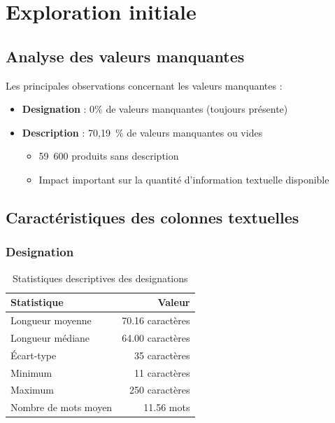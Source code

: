 \documentclass[12pt,a4paper]{article}
\begin{document}
\section{Exploration initiale}

\subsection{Analyse des valeurs manquantes}

Les principales observations concernant les valeurs manquantes :

\begin{itemize}
    \item \textbf{Designation} : 0\% de valeurs manquantes (toujours présente)
    \item \textbf{Description} : 70,19~\% de valeurs manquantes ou vides
    \begin{itemize}
        \item 59~600 produits sans description
        \item Impact important sur la quantité d'information textuelle disponible
    \end{itemize}
\end{itemize}

\subsection{Caractéristiques des colonnes textuelles}

\subsubsection{Designation}

\begin{table}[H]
\centering
\begin{tabular}{@{}lr@{}}
\toprule
\textbf{Statistique} & \textbf{Valeur} \\
\midrule
Longueur moyenne & 70.16 caractères \\
Longueur médiane & 64.00 caractères \\
Écart-type & ~35 caractères \\
Minimum & 11 caractères \\
Maximum & 250 caractères \\
Nombre de mots moyen & 11.56 mots \\
\bottomrule
\end{tabular}
\caption{Statistiques descriptives des designations}
\label{tab:stats_designation}
\end{table}
\end{document}
